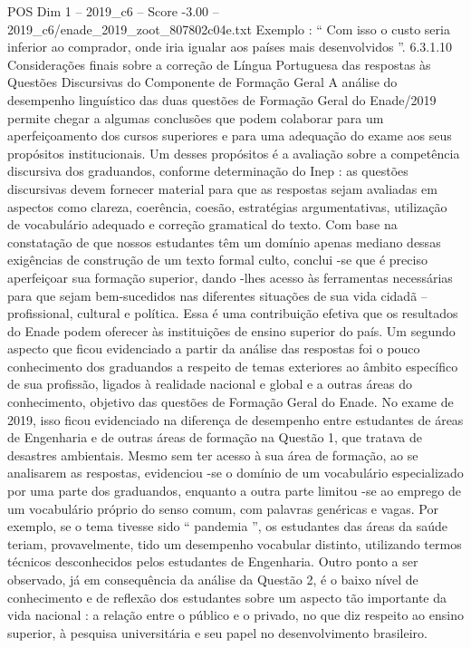 \begin{textsample}{POS Dim 1 – 2019\_c6 – Score -3.00 – 2019\_c6/enade\_2019\_zoot\_807802c04e.txt}
Exemplo : “ Com isso o custo seria inferior ao comprador, onde iria igualar aos países mais desenvolvidos ”. 6.3.1.10 Considerações finais sobre a correção de Língua Portuguesa das respostas às Questões Discursivas do Componente de Formação Geral A análise do desempenho linguístico das duas questões de Formação Geral do Enade/2019 permite chegar a algumas conclusões que podem colaborar para um aperfeiçoamento dos cursos superiores e para uma adequação do exame aos seus propósitos institucionais.
Um desses propósitos é a avaliação sobre a competência discursiva dos graduandos, conforme determinação do Inep : as questões discursivas devem fornecer material para que as respostas sejam avaliadas em aspectos como clareza, coerência, coesão, estratégias argumentativas, utilização de vocabulário adequado e correção gramatical do texto.
Com base na constatação de que nossos estudantes têm um domínio apenas mediano dessas exigências de construção de um texto formal culto, conclui -se que é preciso aperfeiçoar sua formação superior, dando -lhes acesso às ferramentas necessárias para que sejam bem-sucedidos nas diferentes situações de sua vida cidadã – profissional, cultural e política.
Essa é uma contribuição efetiva que os resultados do Enade podem oferecer às instituições de ensino superior do país.
Um segundo aspecto que ficou evidenciado a partir da análise das respostas foi o pouco conhecimento dos graduandos a respeito de temas exteriores ao âmbito específico de sua profissão, ligados à realidade nacional e global e a outras áreas do conhecimento, objetivo das questões de Formação Geral do Enade.
No exame de 2019, isso ficou evidenciado na diferença de desempenho entre estudantes de áreas de Engenharia e de outras áreas de formação na Questão 1, que tratava de desastres ambientais.
Mesmo sem ter acesso à sua área de formação, ao se analisarem as respostas, evidenciou -se o domínio de um vocabulário especializado por uma parte dos graduandos, enquanto a outra parte limitou -se ao emprego de um vocabulário próprio do senso comum, com palavras genéricas e vagas.
Por exemplo, se o tema tivesse sido “ pandemia ”, os estudantes das áreas da saúde teriam, provavelmente, tido um desempenho vocabular distinto, utilizando termos técnicos desconhecidos pelos estudantes de Engenharia.
Outro ponto a ser observado, já em consequência da análise da Questão 2, é o baixo nível de conhecimento e de reflexão dos estudantes sobre um aspecto tão importante da vida nacional : a relação entre o público e o privado, no que diz respeito ao ensino superior, à pesquisa universitária e seu papel no desenvolvimento brasileiro.

\end{textsample}
